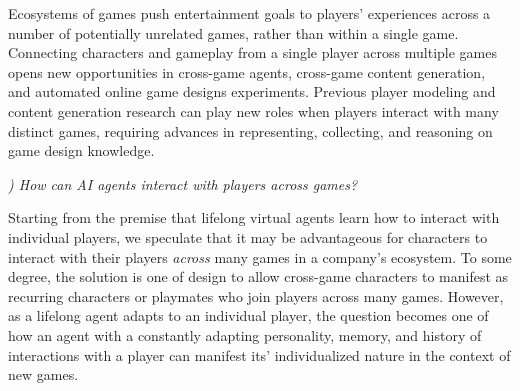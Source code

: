 \documentclass[conference]{IEEEtran}
\newcounter{questionno}
\newcommand{\subsubsectionx}[1]{{\em {\arabic{questionno}) #1}}
	\addtocounter{questionno}{1}
	}
\begin{document}
Ecosystems of games push entertainment goals to players' experiences across a number of potentially unrelated games, rather than within a single game.
Connecting characters and gameplay from a single player across multiple games opens new opportunities in cross-game agents, cross-game content generation, and automated online game designs experiments. 
Previous player modeling and content generation research can play new roles when players interact with many distinct games, requiring advances in representing, collecting, and reasoning on game design knowledge.

\subsubsectionx{How can AI agents interact with players across games?}
%
Starting from the premise that lifelong virtual agents learn how to interact with individual players, we speculate that it may be advantageous for characters to interact with their players {\em across} many games in a company's ecosystem.
To some degree, the solution is one of design to allow cross-game characters to manifest as recurring characters or playmates who join players across many games.
However, as a lifelong agent adapts to an individual player, the question becomes one of how an agent with a constantly adapting personality, memory, and history of interactions with a player can manifest its' individualized nature in the context of new games.
\end{document}
